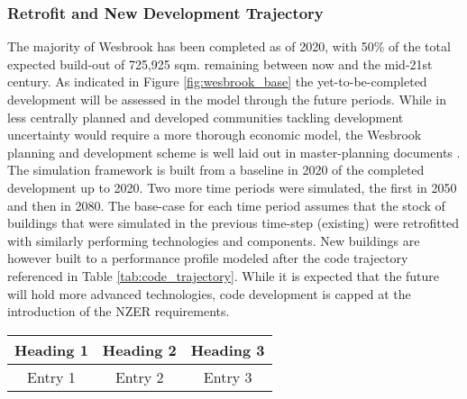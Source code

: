 \documentclass[twocolumn, a4paper,10pt]{article}
\begin{document}
\subsubsection*{Retrofit and New Development Trajectory}
The majority of Wesbrook has been completed as of 2020, with 50\% of the total expected build-out of 725,925 sqm. remaining between now and the mid-21st century. As indicated in Figure \ref{fig:wesbrook_base} the yet-to-be-completed development will be assessed in the model through the future periods. While in less centrally planned and developed communities tackling development uncertainty would require a more thorough economic model, the Wesbrook planning and development scheme is well laid out in master-planning documents \citep{Wesbrook masterplan}. The simulation framework is built from a baseline in 2020 of the completed development up to 2020. Two more time periods were simulated, the first in 2050 and then in 2080. The base-case for each time period assumes that the stock of buildings that were simulated in the previous time-step (existing) were retrofitted with similarly performing technologies and components. New buildings are however built to a performance profile modeled after the code trajectory referenced in Table \ref{tab:code_trajectory}. While it is expected that the future will hold more advanced technologies, code development is capped at the introduction of the NZER requirements.

\begin{table*}[h]
    \vspace{-5pt}   %
    \caption{The first two-column table.}
    \label{tab:code_trajectory}
    \centering
    \begin{tabular}{ | c | c | c | }
        \hline
        \bf{Heading 1} & \bf{Heading} 2 & \bf{Heading 3} \\
        \hline
        Entry 1 & Entry 2 & Entry 3 \\
        \hline
    \end{tabular}
    \vspace{-5pt}   %
\end{table*}
\end{document}
